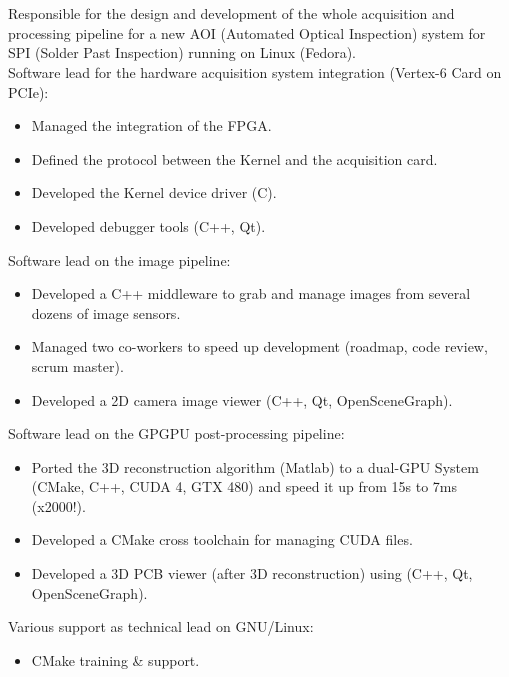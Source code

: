 \documentclass{resume}
\begin{document}
 \\
 {
   \\
  Responsible for the design and development of the whole acquisition and processing pipeline
  for a new AOI (Automated Optical Inspection) system for SPI (Solder Past Inspection)
   running on Linux (Fedora).\\
  Software lead for the hardware acquisition system integration (Vertex-6 Card on PCIe):\\
  \begin{itemize}
  	\item Managed the integration of the FPGA.
  	\item Defined the protocol between the Kernel and the acquisition card.
  	\item Developed the Kernel device driver (C).
  	\item Developed debugger tools (C++, Qt).
  \end{itemize}
  Software lead on the image pipeline:\\
  \begin{itemize}
  	\item Developed a C++ middleware to grab and manage images from several dozens of image sensors.
  	\item Managed two co-workers to speed up development (roadmap, code review, scrum master).
  	\item Developed a 2D camera image viewer (C++, Qt, OpenSceneGraph).
  \end{itemize}
  Software lead on the GPGPU post-processing pipeline:\\
  \begin{itemize}
  	\item Ported the 3D reconstruction algorithm (Matlab) to a dual-GPU System (CMake, C++, CUDA 4, GTX 480)
  		and speed it up from 15s to 7ms (x2000!).
  	\item Developed a CMake cross toolchain for managing CUDA files.
  	\item Developed a 3D PCB viewer (after 3D reconstruction) using (C++, Qt, OpenSceneGraph).
  \end{itemize}
  Various support as technical lead on GNU/Linux:\\
  \begin{itemize}
  	\item CMake training \& support.

\end{itemize}}
\end{document}
